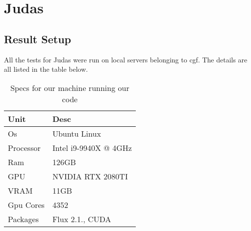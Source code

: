 \section{Judas}
\label{res:Judas}

\subsection{Result Setup}
All the tests for Judas were run on local servers belonging to \acrshort{cgf}. The details are all listed in the table below. \\


\begin{table}[h]
\centering
\begin{tabular}{|l|l|}
\hline
\textbf{Unit} & \textbf{Desc}         \\ \hline
Os            & Ubuntu Linux          \\ \hline
Processor     & Intel i9-9940X @ 4GHz \\ \hline
Ram           & 126GB                 \\ \hline
GPU           & NVIDIA RTX 2080TI     \\ \hline
VRAM          & 11GB                  \\ \hline
Gpu Cores     & 4352                  \\ \hline
Packages      & Flux 2.1., CUDA       \\ \hline
\end{tabular}
\label{tab:specs}
\caption{Specs for our machine running our code}
\end{table}